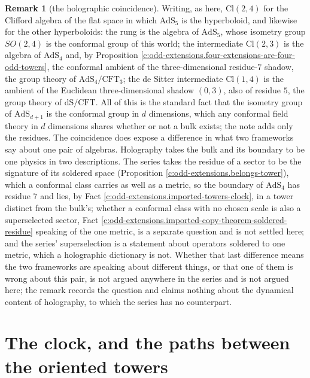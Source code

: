 \documentclass[11pt]{article}
\theoremstyle{definition}
\newtheorem{remark}[theorem]{Remark}
\theoremstyle{plain}
\providecommand{\Cl}{}\renewcommand{\Cl}{\mathrm{Cl}}
\begin{document}
\begin{remark}[the holographic coincidence]\label{c:note.odd-extensions.holographic-coincidence}
Writing, as here, $\Cl(2,4)$ for the Clifford algebra of the flat space in which $\mathrm{AdS}_{5}$ is the hyperboloid, and likewise for the other hyperboloids: the rung is the algebra of $\mathrm{AdS}_{5}$, whose isometry group $SO(2,4)$ is the conformal group of this world; the intermediate $\Cl(2,3)$ is the algebra of $\mathrm{AdS}_{4}$ and, by Proposition \ref{c:odd-extensions.four-extensions-are-four-odd-towers}, the conformal ambient of the three-dimensional residue-$7$ shadow, the group theory of $\mathrm{AdS}_{4}/\mathrm{CFT}_{3}$; the de Sitter intermediate $\Cl(1,4)$ is the ambient of the Euclidean three-dimensional shadow $(0,3)$, also of residue $5$, the group theory of $\mathrm{dS}/\mathrm{CFT}$. All of this is the standard fact that the isometry group of $\mathrm{AdS}_{d+1}$ is the conformal group in $d$ dimensions, which any conformal field theory in $d$ dimensions shares whether or not a bulk exists; the note adds only the residues. The coincidence does expose a difference in what two frameworks say about one pair of algebras. Holography takes the bulk and its boundary to be one physics in two descriptions. The series takes the residue of a sector to be the signature of its soldered space (Proposition \ref{c:odd-extensions.belongs-tower}), which a conformal class carries as well as a metric, so the boundary of $\mathrm{AdS}_{4}$ has residue $7$ and lies, by Fact \ref{c:odd-extensions.imported-towers-clock}, in a tower distinct from the bulk's; whether a conformal class with no chosen scale is also a superselected sector, Fact \ref{c:odd-extensions.imported-copy-theorem-soldered-residue} speaking of the one metric, is a separate question and is not settled here; and the series' superselection is a statement about operators soldered to one metric, which a holographic dictionary is not. Whether that last difference means the two frameworks are speaking about different things, or that one of them is wrong about this pair, is not argued anywhere in the series and is not argued here; the remark records the question and claims nothing about the dynamical content of holography, to which the series has no counterpart.
\end{remark}

\section{The clock, and the paths between the oriented towers}
\end{document}
